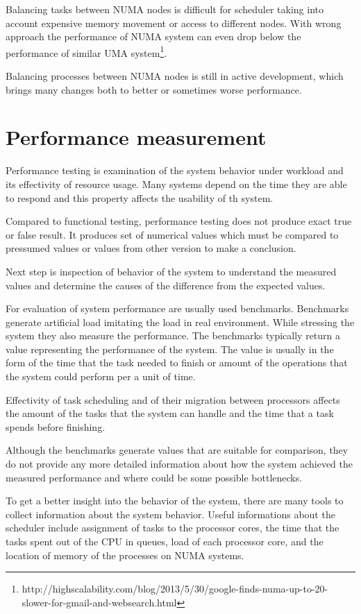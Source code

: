 Balancing tasks between NUMA nodes is difficult for scheduler taking into
account expensive memory movement or access to different nodes. With wrong
approach the performance of NUMA system can even drop below the performance of
similar UMA system\footnote{http://highscalability.com/blog/2013/5/30/google-finds-numa-up-to-20-slower-for-gmail-and-websearch.html}.

Balancing processes between NUMA nodes is still in active development, which
brings many changes both to better or sometimes worse performance.


\chapter{Performance measurement}
Performance testing is examination of the system behavior under workload and its
effectivity of resource usage. Many systems depend on the time they are able to
respond and this property affects the usability of th system.

Compared to functional testing, performance testing does not produce exact true
or false result. It produces set of numerical values which must be compared to
pressumed values or values from other version to make a conclusion.

Next step is inspection of behavior of the system to understand the measured
values and determine the causes of the difference from the expected values.

For evaluation of system performance are usually used benchmarks.
Benchmarks generate artificial load imitating the load in real environment.
While stressing the system they also measure the performance. The benchmarks
typically return a value representing the performance of the system. The value
is usually in the form of the time that the task needed to finish or amount of
the operations that the system could perform per a unit of time.

Effectivity of task scheduling and of their migration between processors affects
the amount of the tasks that the system can handle and the time that a task
spends before finishing.

Although the benchmarks generate values that are suitable for comparison, they
do not provide any more detailed information about how the system achieved the
measured performance and where could be some possible bottlenecks.

To get a better insight into the behavior of the system, there are many tools to
collect information about the system behavior. Useful informations about the
scheduler include assignment of tasks to the processor cores, the time that the
tasks spent out of the CPU in queues, load of each processor core, and the
location of memory of the processes on NUMA systems.

